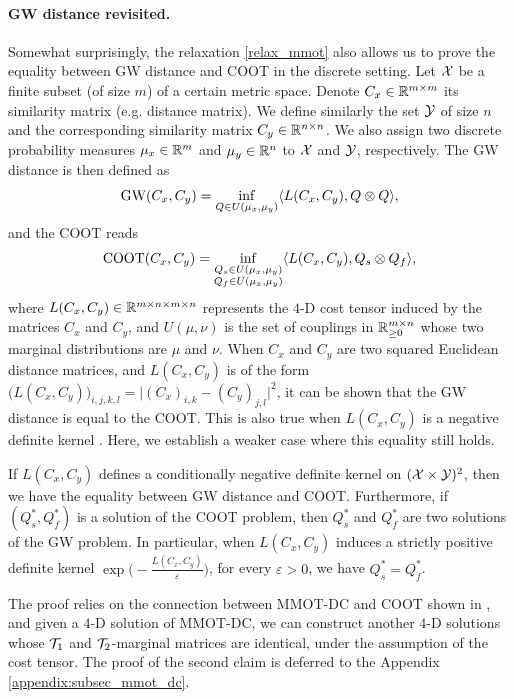 \paragraph{GW distance revisited.} Somewhat surprisingly, the relaxation \eqref{relax_mmot} also allows us to prove the equality
between GW distance and COOT in the discrete setting. Let $\mathcal X$ be a
finite subset (of size $m$) of a certain metric space. Denote $C_x \in \mathbb R^{m \times m}$ its similarity matrix (e.g. distance
matrix). We define similarly the set $\mathcal Y$ of size $n$ and the corresponding similarity matrix $C_y \in \mathbb R^{n \times n}$.
We also assign two discrete probability measures $\mu_x \in \mathbb R^m$ and $\mu_y \in \mathbb R^n$ to $\mathcal X$ and $\mathcal Y$,
respectively. The GW distance is then defined as
\begin{equation}
  \text{GW}(C_x, C_y) = \inf_{Q \in U(\mu_x, \mu_y)} \langle L(C_x, C_y), Q \otimes Q \rangle,
\end{equation}
and the COOT reads
\begin{equation}
  \text{COOT}(C_x, C_y) = \inf_{\substack{Q_s \in U(\mu_x, \mu_y) \\ Q_f \in U(\mu_x, \mu_y)}}
  \langle L(C_x, C_y), Q_s \otimes Q_f \rangle,
\end{equation}
where $L(C_x,C_y) \in \mathbb R^{m \times n \times m \times n}$ represents the $4$-D cost tensor induced by the matrices $C_x$ and $C_y$,
and $U(\mu, \nu)$ is the set of couplings in $\mathbb R^{m \times n}_{\geq 0}$ whose two marginal distributions are $\mu$ and
$\nu$. When $C_x$ and $C_y$ are two squared Euclidean distance matrices, and $L(C_x,C_y)$ is of the form
$\big(L(C_x,C_y)\big)_{i,j,k,l} = \vert (C_x)_{i,k} - (C_y)_{j,l} \vert^2$, it can be shown that the GW distance is equal
to the COOT. This is also true when $L(C_x, C_y)$ is a negative definite kernel \citep{Sejourne20}.
Here, we establish a weaker case where this equality still holds.
\begin{corollary} \label{kernel_gw_coot}
  If $L(C_x, C_y)$ defines a conditionally negative definite kernel on $(\mathcal X \times \mathcal Y)^2$, then we have the equality
  between GW distance and COOT. Furthermore, if $(Q_s^*,Q_f^*)$ is a solution of the COOT problem, then $Q_s^*$ and $Q_f^*$ are
  two solutions of the GW problem. In particular, when $L(C_x, C_y)$ induces a strictly positive definite kernel
  $\exp \big( -\frac{L(C_x, C_y)}{\varepsilon} \big)$, for every $\varepsilon > 0$, we have $Q_s^* = Q_f^*$.
\end{corollary}
The proof relies on the connection between MMOT-DC and COOT shown in ,
and given a $4$-D solution of MMOT-DC, we can construct another $4$-D solutions whose
$\mathcal T_1$ and $\mathcal T_2$-marginal matrices are identical,
under the assumption of the cost tensor. The proof of the second claim is deferred to the
Appendix \ref{appendix:subsec_mmot_dc}.

